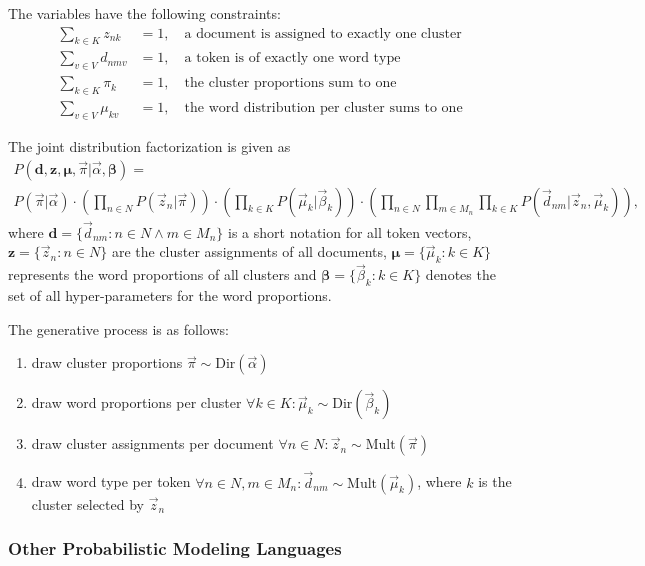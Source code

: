 \begin{Example}
The variables have the following constraints:
\begin{align}
\sum_{k \in K} z_{nk} &= 1,\quad \text{a document is assigned to exactly one cluster}\\
\sum_{v \in V} d_{nmv} &= 1,\quad \text{a token is of exactly one word type}\\
\sum_{k \in K} \pi_{k} &= 1,\quad \text{the cluster proportions sum to one}\\
\sum_{v \in V} \mu_{kv} &= 1,\quad \text{the word distribution per cluster sums to one}
\end{align}

The joint distribution factorization is given as
\begin{multline}
P(\boldsymbol{d},\boldsymbol{z}, \boldsymbol{\mu}, \vec \pi | \vec \alpha, \boldsymbol{\beta}) = \\
 P(\vec \pi | \vec \alpha) \cdot
 \left(\prod_{n \in N} P(\vec z_n | \vec \pi)\right) \cdot
 \left(\prod_{k \in K}P(\vec \mu_k | \vec \beta_k)\right) \cdot 
 \left(\prod_{n \in N} \prod_{m \in M_n} \prod_{k \in K}P(\vec d_{nm} | \vec z_n, \vec \mu_k)\right),
\end{multline}
where $\boldsymbol{d} = \{\vec d_{nm} : n \in N \land m \in M_n \}$ is a short notation for all token vectors, $\boldsymbol{z} = \{ \vec z_n : n \in N \}$ are the cluster assignments of all documents, $\boldsymbol{\mu} = \{ \vec \mu_k : k \in K \}$ represents the word proportions of all clusters and $\boldsymbol{\beta} = \{ \vec \beta_k : k \in K \}$ denotes the set of all hyper-parameters for the word proportions.

The generative process is as follows:
\begin{enumerate}
\item draw cluster proportions $\vec \pi \sim \text{Dir}(\vec \alpha)$
\item draw word proportions per cluster $\forall k \in K: \vec \mu_k \sim \text{Dir}(\vec \beta_k)$
\item draw cluster assignments per document $\forall n \in N: \vec z_n \sim \text{Mult}(\vec \pi)$
\item draw word type per token $\forall n \in N, m \in M_n: \vec d_{nm} \sim \text{Mult}(\vec \mu_k)$, where $k$ is the cluster selected by $\vec z_n$
\end{enumerate}

\end{Example}

\subsubsection{Other Probabilistic Modeling Languages}

